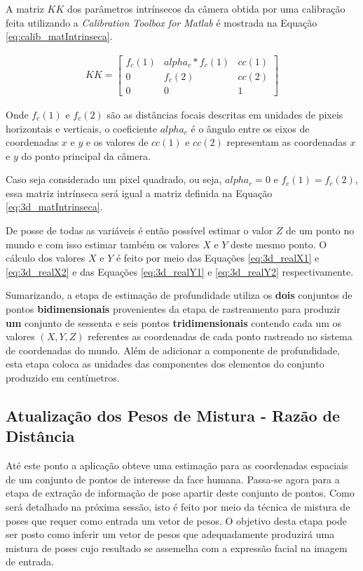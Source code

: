 A matriz $KK$ dos parâmetros intrínsecos da câmera obtida por uma calibração feita utilizando a \textit{Calibration Toolbox for Matlab} é mostrada na Equação \ref{eq:calib_matIntrinseca}.

\begin{align}
KK =
\left[\begin{array}{ccc}
f_c(1) & alpha_c*f_c(1) & cc(1)\\
0 & f_c(2) & cc(2)\\
0 & 0 & 1
\end{array}\right]
\label{eq:calib_matIntrinseca}
\end{align}

Onde $f_c(1)$ e $f_c(2)$ são as distâncias focais descritas em unidades de pixeis horizontais e verticais, o coeficiente $alpha_c$ é o ângulo entre os eixos de coordenadas $x$ e $y$ e os valores de $cc(1)$ e $cc(2)$ representam as coordenadas $x$ e $y$ do ponto principal da câmera.

Caso seja considerado um pixel quadrado, ou seja, $alpha_c = 0$ e $f_c(1) = f_c(2)$, essa matriz intrínseca será igual a matriz definida na Equação \ref{eq:3d_matIntrinseca}.

De posse de todas as variáveis é então possível estimar o valor $Z$ de um ponto no mundo e com isso estimar também os valores $X$ e $Y$ deste mesmo ponto. O cálculo dos valores $X$ e $Y$ é feito por meio das Equações \ref{eq:3d_realX1} e \ref{eq:3d_realX2} e das Equações \ref{eq:3d_realY1} e \ref{eq:3d_realY2} respectivamente.    

Sumarizando, a etapa de estimação de profundidade utiliza os \textbf{dois} conjuntos de pontos \textbf{bidimensionais} provenientes da etapa de rastreamento para produzir \textbf{um} conjunto de sessenta e seis pontos \textbf{tridimensionais} contendo cada um os valores $(X,Y,Z)$ referentes as coordenadas de cada ponto rastreado no sistema de coordenadas do mundo. Além de adicionar a componente de profundidade, esta etapa coloca as unidades das componentes dos elementos do conjunto produzido em centímetros.

\subsection{Atualização dos Pesos de Mistura - Razão de Distância}

Até este ponto a aplicação obteve uma estimação para as coordenadas espaciais de um conjunto de pontos de interesse da face humana. Passa-se agora para a etapa de extração de informação de pose apartir deste conjunto de pontos. Como será detalhado na próxima sessão, isto é feito por meio da técnica de mistura de poses que requer como entrada um vetor de pesos. O objetivo desta etapa pode ser posto como inferir um vetor de pesos que adequadamente produzirá uma mistura de poses cujo resultado se assemelha com a expressão facial na imagem de entrada.

